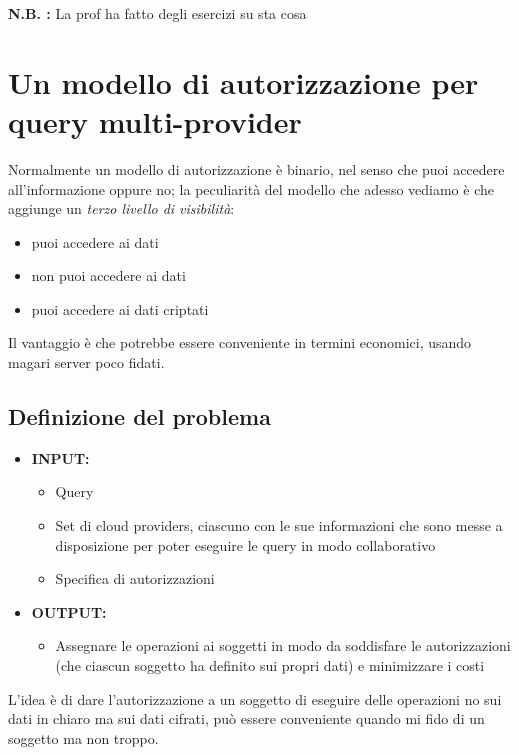 \documentclass{report}
\begin{document}
\noindent \textbf{N.B. :} La prof ha fatto degli esercizi su sta cosa 

\chapter{Un modello di autorizzazione per query multi-provider}

Normalmente un modello di autorizzazione è binario, nel senso che puoi accedere all'informazione oppure no; la peculiarità del modello 
che adesso vediamo è che aggiunge un \textit{terzo livello di visibilità}:
\begin{itemize}
    \item puoi accedere ai dati
    \item non puoi accedere ai dati
    \item puoi accedere ai dati criptati 
\end{itemize}

\noindent Il vantaggio è che potrebbe essere conveniente in termini economici, usando magari server poco fidati.

\section{Definizione del problema}

\begin{itemize}
    \item \textbf{INPUT:}
    \begin{itemize}
        \item Query 
        \item Set di cloud providers, ciascuno con le sue informazioni che sono messe a disposizione per poter eseguire le query in modo collaborativo
        \item Specifica di autorizzazioni 
    \end{itemize}
    \item \textbf{OUTPUT:}
    \begin{itemize}
        \item Assegnare le operazioni ai soggetti in modo da soddisfare le autorizzazioni (che ciascun soggetto ha definito sui propri dati) e minimizzare i costi
    \end{itemize}
\end{itemize}

\noindent L'idea è di dare l'autorizzazione a un soggetto di eseguire delle operazioni no sui dati in chiaro ma sui dati cifrati,
può essere conveniente quando mi fido di un soggetto ma non troppo.
\end{document}
